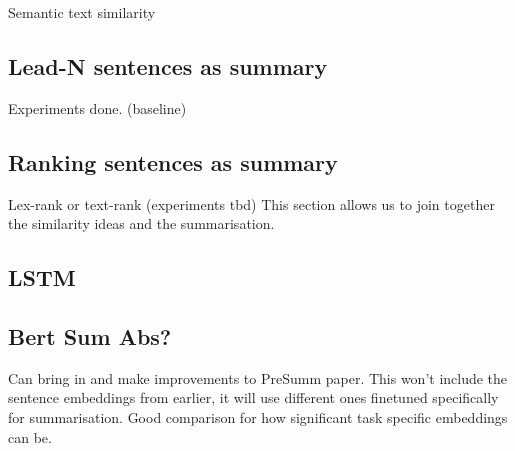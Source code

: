 \documentclass[a4 paper, 12pt]{article}
\begin{document}
Semantic text similarity 
\subsection{Lead-N sentences as summary}
Experiments done. (baseline)
\subsection{Ranking sentences as summary}
Lex-rank or text-rank (experiments tbd)
This section allows us to join together the similarity ideas and the summarisation. 
\subsection{LSTM}

\subsection{Bert Sum Abs?}
Can bring in and make improvements to PreSumm paper. This won't include the sentence embeddings from earlier, it will use different ones finetuned specifically for summarisation. Good comparison for how significant task specific embeddings can be.
\end{document}
